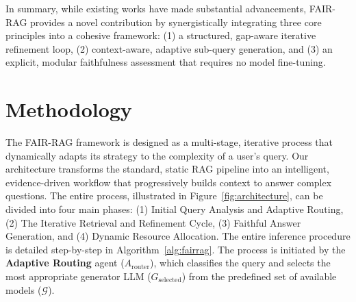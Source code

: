 \documentclass[11pt]{article}
\begin{document}
In summary, while existing works have made substantial advancements, FAIR-RAG provides a novel contribution by synergistically integrating three core principles into a cohesive framework: (1) a structured, gap-aware iterative refinement loop, (2) context-aware, adaptive sub-query generation, and (3) an explicit, modular faithfulness assessment that requires no model fine-tuning.

\section{Methodology}

The FAIR-RAG framework is designed as a multi-stage, iterative process that dynamically adapts its strategy to the complexity of a user's query. Our architecture transforms the standard, static RAG pipeline into an intelligent, evidence-driven workflow that progressively builds context to answer complex questions. The entire process, illustrated in Figure~\ref{fig:architecture}, can be divided into four main phases: (1) Initial Query Analysis and Adaptive Routing, (2) The Iterative Retrieval and Refinement Cycle, (3) Faithful Answer Generation, and (4) Dynamic Resource Allocation. The entire inference procedure is detailed step-by-step in Algorithm~\ref{alg:fairrag}. The process is initiated by the \textbf{Adaptive Routing} agent ($A_{\text{router}}$), which classifies the query and selects the most appropriate generator LLM ($G_{\text{selected}}$) from the predefined set of available models ($\mathcal{G}$).
\end{document}
